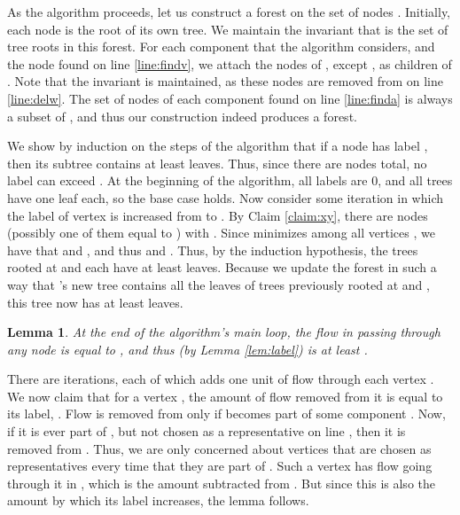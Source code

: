 \documentclass[11pt]{article}
\newcommand{\qed}{\hspace*{\fill}}
\newtheorem{lemma}[theorem]{Lemma}
\newenvironment{proof}[1][Proof. ]{\noindent {\bf #1 }}{\qed}
\newenvironment{proofof}[1]{\medskip \noindent {\bf{Proof of #1. }}}{\qed}
\begin{document}
\begin{proofof}{Lemma \ref{lem:label}}
As the algorithm proceeds, let us construct a forest on the set of nodes . Initially, each 
node is the root of its own tree. We maintain the invariant that  is the set of tree roots 
in this forest. For each component  that the algorithm considers, and the node  found 
on line \ref{line:findv}, we attach the nodes of , except , as children of . Note 
that the invariant is maintained, as these nodes are removed from  on line \ref{line:delw}. 
The set of nodes of each component  found on line \ref{line:finda} is always 
a subset of , and thus our construction indeed produces a forest. 

We show by induction on the steps of the algorithm that if a node has label , then its 
subtree contains at least  leaves. Thus, since there are  nodes total, no label can 
exceed . At the beginning of the algorithm, all labels are 0, and all trees have 
one leaf each, so the base case holds. Now consider some iteration in which the label of 
vertex  is increased from  to . By Claim  \ref{claim:xy}, there are 
nodes  (possibly one of them equal to ) with . Since  minimizes 
 among all vertices  , we have that  and 
, and thus  and . 
Thus, by the induction hypothesis, the trees rooted at  and  each have at least 
 leaves. Because we update the forest in such a way that 's new tree 
contains all the leaves of trees previously rooted at  and , this tree now has at 
least  leaves. 
\end{proofof}



\begin{lemma} \label{lem:amtflow}
At the end of the algorithm's main loop, the flow in  passing through any node  
is equal to , and thus (by Lemma \ref{lem:label}) is at least .
\end{lemma}
\begin{proof}
There are  iterations, each of which adds one unit of flow through each vertex . 
We now claim that for a vertex , the amount of flow removed from it is equal to its label, 
. Flow is removed from  only if  becomes part of some component . Now, if it is ever 
part of , but not chosen as a representative on line , then it is removed 
from . Thus, we are only concerned about vertices that are chosen as representatives every 
time that  they are  part of . Such a vertex has flow  going through it in , which 
is the amount subtracted from . But since this is also the amount by which its label increases, 
the lemma follows.
\end{proof}
\end{document}
